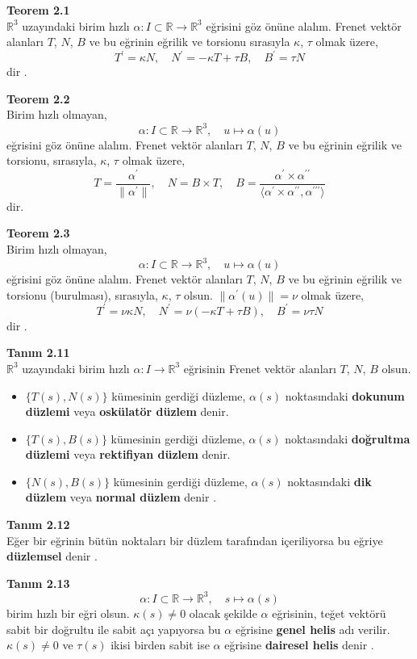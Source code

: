 \documentclass[a4paper,12pt]{article}
\begin{document}
\textbf{Teorem 2.1} \\
$\mathbb{R}^3$ uzayındaki birim hızlı $\alpha : I \subset \mathbb{R} \to \mathbb{R}^3$ eğrisini göz önüne alalım. Frenet vektör alanları $T$, $N$, $B$ ve bu eğrinin eğrilik ve torsionu sırasıyla $\kappa$, $\tau$ olmak üzere,
\[
T^\prime = \kappa N, \quad
N^\prime = -\kappa T + \tau B, \quad
B^\prime = \tau N
\]
dir   .

\textbf{Teorem 2.2} \\
Birim hızlı olmayan,
\[
\alpha: I \subset \mathbb{R} \to \mathbb{R}^3, \quad u \mapsto \alpha(u)
\]
eğrisini göz önüne alalım. Frenet vektör alanları $T$, $N$, $B$ ve bu eğrinin eğrilik ve torsionu, sırasıyla, $\kappa$, $\tau$ olmak üzere,
\[
T = \frac{\alpha^\prime}{\|\alpha^\prime\|}, \quad
N = B \times T, \quad
B = \frac{\alpha^\prime \times \alpha^{\prime\prime}}{\langle \alpha^\prime \times \alpha^{\prime\prime}, \alpha^{\prime\prime\prime} \rangle}
\]
dir.

\textbf{Teorem 2.3} \\ 
Birim hızlı olmayan,
\[
\alpha: I \subset \mathbb{R} \to \mathbb{R}^3, \quad u \mapsto \alpha(u)
\]
eğrisini göz önüne alalım. Frenet vektör alanları $T$, $N$, $B$ ve bu eğrinin eğrilik ve torsionu (burulması), sırasıyla, $\kappa$, $\tau$ olsun. $\|\alpha^\prime(u)\| = \nu$ olmak üzere,
\[
T^\prime = \nu \kappa N, \quad
N^\prime = \nu(-\kappa T + \tau B), \quad
B^\prime = \nu \tau N
\]
dir   .

\textbf{Tanım 2.11} \\
$\mathbb{R}^3$ uzayındaki birim hızlı $\alpha: I \to \mathbb{R}^3$ eğrisinin Frenet vektör alanları $T$, $N$, $B$ olsun.
\begin{itemize}
    \item $\{T(s), N(s)\}$ kümesinin gerdiği düzleme, $\alpha(s)$ noktasındaki \textbf{dokunum düzlemi} veya \textbf{oskülatör düzlem} denir.
    \item $\{T(s), B(s)\}$ kümesinin gerdiği düzleme, $\alpha(s)$ noktasındaki \textbf{doğrultma düzlemi} veya \textbf{rektifiyan düzlem} denir.
    \item $\{N(s), B(s)\}$ kümesinin gerdiği düzleme, $\alpha(s)$ noktasındaki \textbf{dik düzlem} veya \textbf{normal düzlem} denir   .
\end{itemize}

\textbf{Tanım 2.12} \\
Eğer bir eğrinin bütün noktaları bir düzlem tarafından içeriliyorsa bu eğriye \textbf{düzlemsel} denir   .

\textbf{Tanım 2.13} \\
\[
\alpha: I \subset \mathbb{R} \to \mathbb{R}^3, \quad s \mapsto \alpha(s)
\]
birim hızlı bir eğri olsun. $\kappa(s) \neq 0$ olacak şekilde $\alpha$ eğrisinin, teğet vektörü sabit bir doğrultu ile sabit açı yapıyorsa bu $\alpha$ eğrisine \textbf{genel helis} adı verilir. $\kappa(s) \neq 0$ ve $\tau(s)$ ikisi birden sabit ise $\alpha$ eğrisine \textbf{dairesel helis} denir   .
\end{document}
